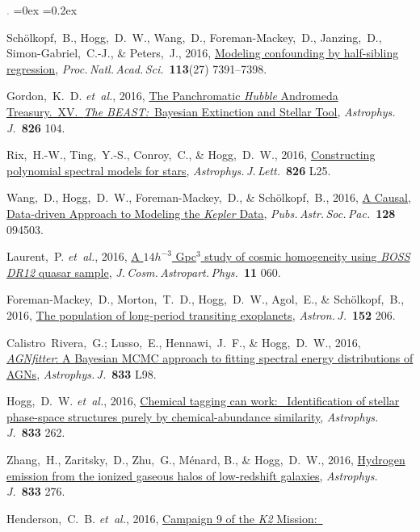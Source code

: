 \documentclass[12pt,letterpaper]{article}
\newcommand{\latin}[1]{\textsl{#1}}
\newcommand{\etal}{\latin{et~al.}}
\newcommand{\satellite}[1]{\textsl{#1}}
\newcommand{\project}[1]{\textsl{#1}}
\newcommand{\doi}[2]{\href{http://dx.doi.org/#1}{{#2}}}
\newcommand{\deemph}[1]{\textcolor{grey}{\footnotesize{#1}}}
\newcommand{\pubnumber}[1]{\deemph{{#1}.}}
\newcounter{refpubnum}
\newcommand{\hogglist}{%
    \rightmargin=0in
    \leftmargin=0.18in
    \topsep=0ex
    \partopsep=0pt
    \itemsep=0.2ex
    \parsep=0pt
    \itemindent=-1.0\leftmargin
    \listparindent=0.0\leftmargin
    \settowidth{\labelsep}{~}
    \usecounter{refpubnum}
  }
\begin{document}
\begin{list}{\pubnumber{\therefpubnum}}{\hogglist}
\item
Sch\"olkopf,~B., Hogg,~D.~W., Wang,~D., Foreman-Mackey,~D., Janzing,~D., Simon-Gabriel,~C.-J., \& Peters,~J., 2016,
\doi{10.1073/pnas.1511656113}{Modeling confounding by half-sibling regression},
\textit{Proc.\,Natl.\,Acad.\,Sci.}\ \textbf{113}(27) 7391--7398.
\item
Gordon,~K.~D. \etal, 2016,
\doi{10.3847/0004-637X/826/2/104}{The Panchromatic \satellite{Hubble} Andromeda Treasury.\ XV.\
\project{The BEAST:}\ Bayesian Extinction and Stellar Tool},
\textit{Astrophys.\,J.}\ \textbf{826} 104.
\item
Rix,~H.-W., Ting,~Y.-S., Conroy,~C., \& Hogg,~D.~W., 2016,
\doi{10.3847/2041-8205/826/2/L25}{Constructing polynomial spectral models for stars},
\textit{Astrophys.\,J.\,Lett.}\ \textbf{826} L25.
\item
Wang,~D., Hogg,~D.~W., Foreman-Mackey,~D., \& Sch\"olkopf,~B., 2016,
\doi{10.1088/1538-3873/128/967/094503}{A Causal, Data-driven Approach to Modeling the \satellite{Kepler} Data},
\textit{Pubs.\,Astr.\,Soc.\,Pac.}\ \textbf{128} 094503.
\item
Laurent,~P. \etal, 2016,
\doi{10.1088/1475-7516/2016/11/060}{A $14 h^{-3}$ Gpc$^3$ study of cosmic homogeneity using \project{BOSS DR12} quasar sample},
\textit{J.\,Cosm.\,Astropart.\,Phys.}\ \textbf{11} 060.
\item
Foreman-Mackey,~D., Morton,~T.~D., Hogg,~D.~W., Agol,~E., \& Sch\"olkopf,~B., 2016,
\doi{10.3847/0004-6256/152/6/206}{The population of long-period transiting exoplanets},
\textit{Astron.\,J.}\ \textbf{152} 206.
\item
Calistro~Rivera,~G.; Lusso,~E., Hennawi,~J.~F., \& Hogg,~D.~W., 2016,
\doi{10.3847/1538-4357/833/1/98}{\project{AGNfitter}: A Bayesian MCMC approach to fitting spectral energy distributions of AGNs},
\textit{Astrophys.\,J.}\ \textbf{833} L98.
\item
Hogg,~D.~W. \etal, 2016,
\doi{10.3847/1538-4357/833/2/262}{Chemical tagging can work:\ %
Identification of stellar phase-space structures purely by chemical-abundance similarity},
\textit{Astrophys.\,J.}\ \textbf{833} 262.
\item
Zhang,~H., Zaritsky,~D., Zhu,~G., M\'enard, B., \& Hogg,~D.~W., 2016,
\doi{10.3847/1538-4357/833/2/276}{Hydrogen emission from the ionized gaseous halos of low-redshift galaxies},
\textit{Astrophys.\,J.}\ \textbf{833} 276.
\item
Henderson,~C.~B. \etal, 2016,
\doi{10.1088/1538-3873/128/970/124401}{Campaign 9 of the \project{K2} Mission:\ 
}
\end{list}
\end{document}
